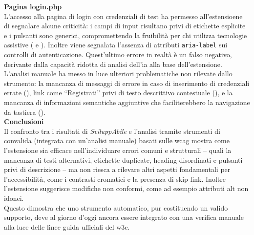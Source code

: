 \noindent \textbf{Pagina login.php}\\
L’accesso alla pagina di login con credenziali di test ha permesso all'estensioene di segnalare alcune criticità: i campi di input risultano privi di etichette esplicite e i pulsanti sono generici, compromettendo la fruibilità per chi utilizza tecnologie assistive ({} e {}). Inoltre viene segnalata l'assenza di attributi \texttt{aria-label} sui controlli di autenticazione. Quest'ultimo errore in realtà è un falso negativo, derivante dalla capacità ridotta di analisi dell'\acrshort{ia} alla base dell'estensione.\\
L’analisi manuale ha messo in luce ulteriori problematiche non rilevate dallo strumento: la mancanza di messaggi di errore in caso di inserimento di credenziali errate ({}), link come “Registrati” privi di testo descrittivo contestuale ({}), e la mancanza di informazioni semantiche aggiuntive che faciliterebbero la navigazione da tastiera ({}). \\

\noindent \textbf{Conclusioni}\\
Il confronto tra i risultati di \textit{SviluppAbile} e l’analisi tramite strumenti di convalida (integrata con un'analisi manuale) basati sulle \acrshort{wcag} mostra come l’estensione sia efficace nell’individuare errori comuni e strutturali – quali la mancanza di testi alternativi, etichette duplicate, heading disordinati e pulsanti privi di descrizione – ma non riesca a rilevare altri aspetti fondamentali per l’accessibilità, come i contrasti cromatici e la presenza di skip link. Inoltre l'estensione suggerisce modifiche non conformi, come ad esempio attributi alt non idonei.\\
Questo dimostra che uno strumento automatico, pur costituendo un valido supporto, deve al giorno d'oggi ancora essere integrato con una verifica manuale alla luce delle linee guida ufficiali del \acrshort{w3c}.

